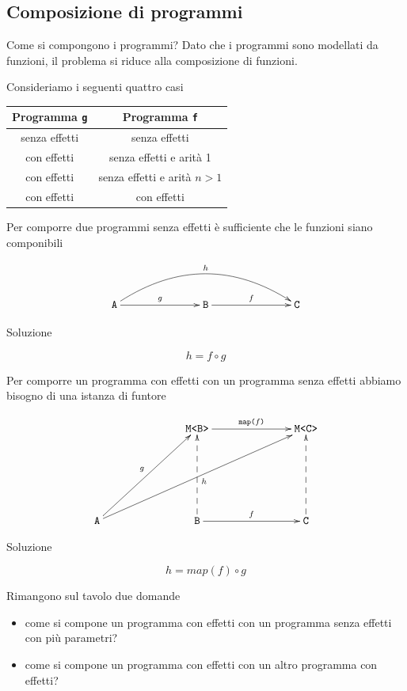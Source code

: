 \documentclass[12pt]{article}
\theoremstyle{definition}
\begin{document}
\subsection{Composizione di programmi}

Come si compongono i programmi? Dato che i programmi sono modellati da funzioni, il problema si riduce alla composizione di funzioni.

Consideriamo i seguenti quattro casi

\begin{center}
\bgroup
\def\arraystretch{1.5}
\begin{tabular}{ |c|c| }
\hline
Programma \texttt{g} & Programma \texttt{f} \\
\hline
senza effetti & senza effetti \\
\hline
con effetti & senza effetti e arità 1 \\
\hline
con effetti & senza effetti e arità $n > 1$ \\
\hline
con effetti & con effetti \\
\hline
\end{tabular}
\egroup
\end{center}

Per comporre due programmi senza effetti è sufficiente che le funzioni siano componibili

\[
\xymatrixrowsep{2.5cm}
\xymatrixcolsep{2.5cm}
\xymatrix{
  \texttt{A} \ar[r]^{g} \ar@/^1cm/[rr]^{h} & \texttt{B} \ar[r]^{f} & \texttt{C}
}
\]

Soluzione

$$
h = f \circ g
$$

Per comporre un programma con effetti con un programma senza effetti abbiamo bisogno di una istanza di funtore

\[
\xymatrixrowsep{2.5cm}
\xymatrixcolsep{2.5cm}
\xymatrix{
  & \texttt{M<B>} \ar[r]^{\texttt{map(}f\texttt{)}} & \texttt{M<C>}  \\
  \texttt{A} \ar[ur]^{g} \ar[urr]_{h} & \texttt{B} \ar@{-->}[u] \ar[r]^{f} & \texttt{C} \ar@{-->}[u]
}
\]

Soluzione

$$
h = map(f) \circ g
$$

Rimangono sul tavolo due domande

\begin{itemize}
\item come si compone un programma con effetti con un programma senza effetti con più parametri?
\item come si compone un programma con effetti con un altro programma con effetti?
\end{itemize}
\end{document}
